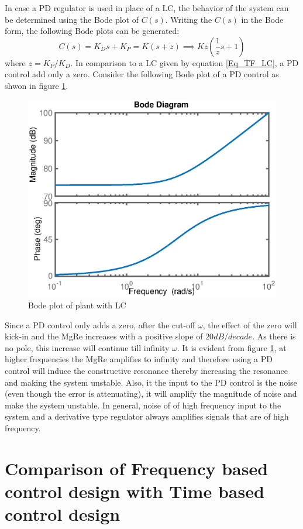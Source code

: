 In case a PD regulator is used in place of a LC, the behavior of the system can be determined using the Bode plot of $C(s)$. Writing the $C(s)$ in the Bode form, the following Bode plots can be generated:
\begin{equation}
	C(s) = K_D s + K_P = K (s + z) \implies K z \left( \frac{1}{z}s + 1 \right)
\end{equation}
where $z = K_P / K_D$. In comparison to a LC given by equation \eqref{Eq_TF_LC}, a PD control add only a zero. Consider the following Bode plot of a PD control as shwon in figure \ref{Fig_FreqCDPDBode}.
\begin{figure}[h!]
	\centering
	\includegraphics[width=0.8\linewidth]{Bilder/FreqCDPDBode.eps}
	\caption{Bode plot of plant with LC}
	\label{Fig_FreqCDPDBode}
\end{figure}

Since a PD control only adds a zero, after the cut-off $\omega$, the effect of the zero will kick-in and the MgRe increases with a positive slope of $20 dB/decade$. As there is no pole, this increase will continue till infinity $\omega$. It is evident from figure \ref{Fig_FreqCDPDBode}, at higher frequencies the MgRe amplifies to infinity and therefore using a PD control will induce the constructive resonance thereby increasing the resonance and making the system unstable. Also, it the input to the PD control is the noise (even though the error is attenuating), it will amplify the magnitude of noise and make the system unstable. In general, noise of of high frequency input to the system and a derivative type regulator always amplifies signals that are of high frequency.

\section{Comparison of Frequency based control design with Time based control design}


